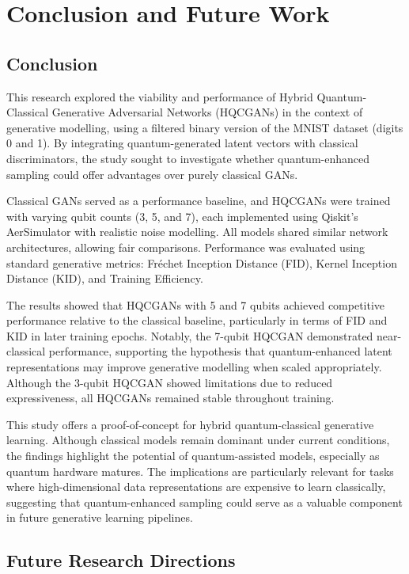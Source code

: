 \chapter{Conclusion and Future Work}
\label{ch:concl}

\section{Conclusion}

This research explored the viability and performance of Hybrid Quantum-Classical Generative Adversarial Networks (HQCGANs) in the context of generative modelling, using a filtered binary version of the MNIST dataset (digits 0 and 1). By integrating quantum-generated latent vectors with classical discriminators, the study sought to investigate whether quantum-enhanced sampling could offer advantages over purely classical GANs.

Classical GANs served as a performance baseline, and HQCGANs were trained with varying qubit counts (3, 5, and 7), each implemented using Qiskit’s AerSimulator with realistic noise modelling. All models shared similar network architectures, allowing fair comparisons. Performance was evaluated using standard generative metrics: Fréchet Inception Distance (FID), Kernel Inception Distance (KID), and Training Efficiency.

The results showed that HQCGANs with 5 and 7 qubits achieved competitive performance relative to the classical baseline, particularly in terms of FID and KID in later training epochs. Notably, the 7-qubit HQCGAN demonstrated near-classical performance, supporting the hypothesis that quantum-enhanced latent representations may improve generative modelling when scaled appropriately. Although the 3-qubit HQCGAN showed limitations due to reduced expressiveness, all HQCGANs remained stable throughout training.

This study offers a proof-of-concept for hybrid quantum-classical generative learning. Although classical models remain dominant under current conditions, the findings highlight the potential of quantum-assisted models, especially as quantum hardware matures. The implications are particularly relevant for tasks where high-dimensional data representations are expensive to learn classically, suggesting that quantum-enhanced sampling could serve as a valuable component in future generative learning pipelines.

\section{Future Research Directions}

